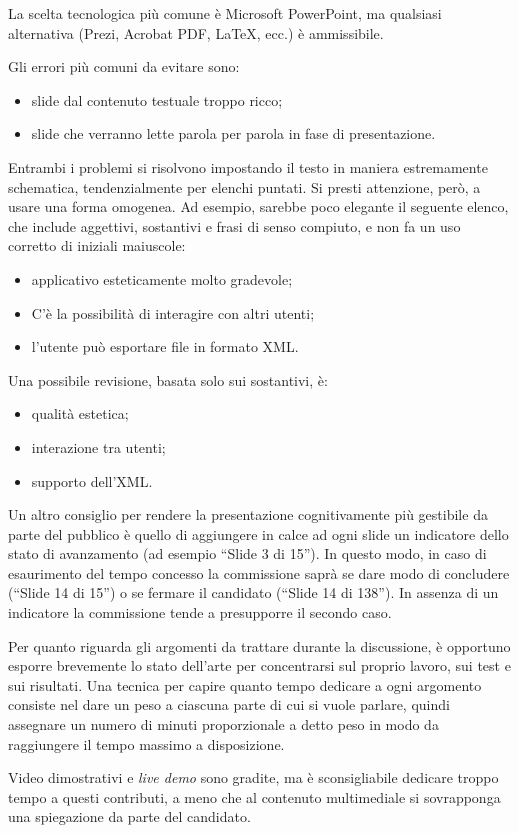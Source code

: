 \documentclass[12pt,italian]{report}
\begin{document}
La scelta tecnologica più comune è Microsoft PowerPoint, ma qualsiasi alternativa (Prezi, Acrobat PDF, \LaTeX, ecc.) è ammissibile. 

Gli errori più comuni da evitare sono:

\begin{itemize}
	\item slide dal contenuto testuale troppo ricco;
	\item slide che verranno lette parola per parola in fase di presentazione.
\end{itemize}

Entrambi i problemi si risolvono impostando il testo in maniera estremamente schematica, tendenzialmente per elenchi puntati. Si presti attenzione, però, a usare una forma omogenea. 
Ad esempio, sarebbe poco elegante il seguente elenco, che include aggettivi, sostantivi e frasi di senso compiuto, e non fa un uso corretto di iniziali maiuscole:

\begin{itemize}
	\item applicativo esteticamente molto gradevole;
	\item C'è la possibilità di interagire con altri utenti;
	\item l'utente può esportare file in formato XML.
\end{itemize}

Una possibile revisione, basata solo sui sostantivi, è: 

\begin{itemize}
	\item qualità estetica;
	\item interazione tra utenti;
	\item supporto dell'XML.
\end{itemize}

Un altro consiglio per rendere la presentazione cognitivamente più gestibile da parte del pubblico è quello di aggiungere in calce ad ogni slide un indicatore dello stato di avanzamento (ad esempio ``Slide 3 di 15''). In questo modo, in caso di esaurimento del tempo concesso la commissione saprà se dare modo di concludere (``Slide 14 di 15'') o se fermare il candidato (``Slide 14 di 138''). In assenza di un indicatore la commissione tende a presupporre il secondo caso.

Per quanto riguarda gli argomenti da trattare durante la discussione, è opportuno esporre brevemente lo stato dell'arte per concentrarsi sul proprio lavoro, sui test e sui risultati. Una tecnica per capire quanto tempo dedicare a ogni argomento consiste nel dare un peso a ciascuna parte di cui si vuole parlare, quindi assegnare un numero di minuti proporzionale a detto peso in modo da raggiungere il tempo massimo a disposizione.

Video dimostrativi e \textit{live demo} sono gradite, ma è sconsigliabile dedicare troppo tempo a questi contributi, a meno che al contenuto multimediale si sovrapponga una spiegazione da parte del candidato.

%
%





\closingpage
\end{document}
